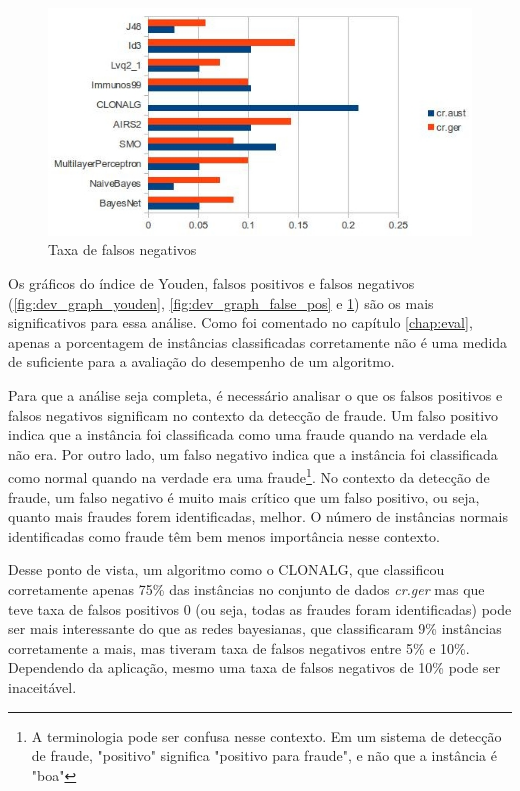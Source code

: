 \begin{figure}[h]
    \centering
    \caption{Taxa de falsos negativos}
    \label{fig:dev_graph_false_neg}
    \includegraphics[width=1\textwidth]{img/graph_false_neg.jpg}
\end{figure}

Os gráficos do índice de Youden, falsos positivos e falsos negativos (\ref{fig:dev_graph_youden}, \ref{fig:dev_graph_false_pos} e \ref{fig:dev_graph_false_neg}) são os mais significativos para essa análise. Como foi comentado no capítulo \ref{chap:eval}, apenas a porcentagem de instâncias classificadas corretamente não é uma medida de suficiente para a avaliação do desempenho de um algoritmo.

Para que a análise seja completa, é necessário analisar o que os falsos positivos e falsos negativos significam no contexto da detecção de fraude. Um falso positivo indica que a instância foi classificada como uma fraude quando na verdade ela não era. Por outro lado, um falso negativo indica que a instância foi classificada como normal quando na verdade era uma fraude\footnote{A terminologia pode ser confusa nesse contexto. Em um sistema de detecção de fraude, "positivo" significa "positivo para fraude", e não que a instância é "boa"}. No contexto da detecção de fraude, um falso negativo é muito mais crítico que um falso positivo, ou seja, quanto mais fraudes forem identificadas, melhor. O número de instâncias normais identificadas como fraude têm bem menos importância nesse contexto.

Desse ponto de vista, um algoritmo como o CLONALG, que classificou corretamente apenas 75\% das instâncias no conjunto de dados \emph{cr.ger} mas que teve taxa de falsos positivos 0 (ou seja, todas as fraudes foram identificadas) pode ser mais interessante do que as redes bayesianas, que classificaram 9\% instâncias corretamente a mais, mas tiveram taxa de falsos negativos entre 5\% e 10\%. Dependendo da aplicação, mesmo uma taxa de falsos negativos de 10\% pode ser inaceitável.

